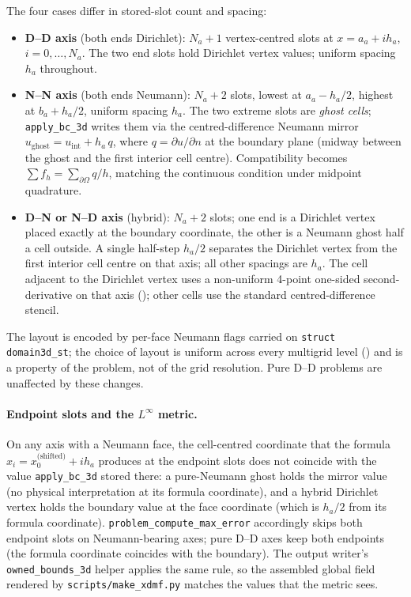 \documentclass[11pt]{article}
\theoremstyle{definition}
\begin{document}
The four cases differ in stored-slot count and spacing:
\begin{itemize}
  \item \textbf{D--D axis} (both ends Dirichlet): $N_a + 1$
    vertex-centred slots at $x = a_a + i h_a$, $i = 0, \dots, N_a$.
    The two end slots hold Dirichlet vertex values; uniform spacing
    $h_a$ throughout.
  \item \textbf{N--N axis} (both ends Neumann): $N_a + 2$ slots,
    lowest at $a_a - h_a/2$, highest at $b_a + h_a/2$, uniform
    spacing $h_a$.  The two extreme slots are \emph{ghost cells};
    \texttt{apply\_bc\_3d} writes them via the centred-difference
    Neumann mirror
    $u_{\text{ghost}} = u_{\text{int}} + h_a\,q$, where
    $q = \partial u/\partial n$ at the boundary plane (midway
    between the ghost and the first interior cell centre).
    Compatibility becomes
    $\sum f_h = \sum_{\partial\Omega} q/h$, matching the
    continuous condition under midpoint quadrature.
  \item \textbf{D--N or N--D axis} (hybrid): $N_a + 2$ slots; one
    end is a Dirichlet vertex placed exactly at the boundary
    coordinate, the other is a Neumann ghost half a cell outside.
    A single half-step $h_a/2$ separates the Dirichlet vertex from
    the first interior cell centre on that axis; all other
    spacings are $h_a$.  The cell adjacent to the Dirichlet vertex
    uses a non-uniform 4-point one-sided second-derivative on that
    axis (); other cells use the standard
    centred-difference stencil.
\end{itemize}

The layout is encoded by per-face Neumann flags carried on
\texttt{struct domain3d\_st}; the choice of layout is uniform across
every multigrid level () and is a property of
the problem, not of the grid resolution.  Pure D--D problems are
unaffected by these changes.

\paragraph{Endpoint slots and the $L^\infty$ metric.}
On any axis with a Neumann face, the cell-centred coordinate that
the formula $x_i = x_0^{\text{(shifted)}} + i h_a$ produces at the
endpoint slots does not coincide with the value
\texttt{apply\_bc\_3d} stored there: a pure-Neumann ghost holds the
mirror value (no physical interpretation at its formula coordinate),
and a hybrid Dirichlet vertex holds the boundary value at the face
coordinate (which is $h_a/2$ from its formula coordinate).
\texttt{problem\_compute\_max\_error} accordingly skips both
endpoint slots on Neumann-bearing axes; pure D--D axes keep both
endpoints (the formula coordinate coincides with the boundary).
The output writer's \texttt{owned\_bounds\_3d} helper applies the
same rule, so the assembled global field rendered by
\texttt{scripts/make\_xdmf.py} matches the values that the metric
sees.
\end{document}
